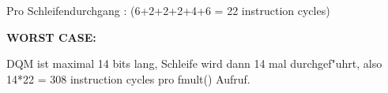 Pro Schleifendurchgang : (6+2+2+2+4+6 = 22 instruction cycles)

{\bf WORST CASE: }

DQM ist maximal 14 bits lang, Schleife wird dann 14 mal durchgef"uhrt, also 14*22 =
308 instruction cycles pro fmult() Aufruf.

\newpage




\newpage





